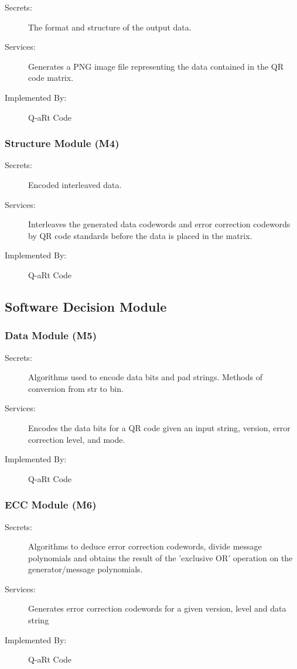 \documentclass[12pt, titlepage]{article}
\begin{document}
\begin{description}
\item[Secrets:] The format and structure of the output data.
\item[Services:] Generates a PNG image file representing the data contained in the QR code matrix.
\item[Implemented By:] Q-aRt Code
\end{description}

\subsubsection{Structure Module (M4)}

\begin{description}
\item[Secrets:] Encoded interleaved data.
\item[Services:] Interleaves the generated data codewords and error correction codewords by QR code standards before the data is placed in the matrix.
\item[Implemented By:] Q-aRt Code
\end{description}

\subsection{Software Decision Module}

\subsubsection{Data Module (M5)}

\begin{description}
\item[Secrets:] Algorithms used to  encode data bits and pad strings. Methods of conversion from str to bin.
\item[Services:] Encodes the data bits for a QR code given an input string, version, error correction level, and mode.
\item[Implemented By:] Q-aRt Code
\end{description}

\subsubsection{ECC Module (M6)}

\begin{description}
\item[Secrets:] Algorithms to deduce error correction codewords, divide message polynomials and obtains the result of the 'exclusive OR' operation on the generator/message polynomials.
\item[Services:] Generates error correction codewords for a given version, level and data string
\item[Implemented By:] Q-aRt Code
\end{description}
\end{document}

